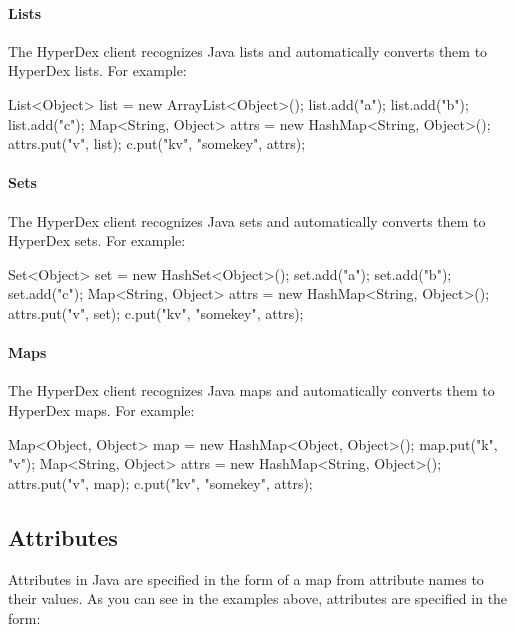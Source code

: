 \paragraph{Lists}

The HyperDex client recognizes Java lists and automatically converts them to
HyperDex lists.  For example:

\begin{javacode}
List<Object> list = new ArrayList<Object>();
list.add("a");
list.add("b");
list.add("c");
Map<String, Object> attrs = new HashMap<String, Object>();
attrs.put("v", list);
c.put("kv", "somekey", attrs);
\end{javacode}

\paragraph{Sets}

The HyperDex client recognizes Java sets and automatically converts them to
HyperDex sets.  For example:

\begin{javacode}
Set<Object> set = new HashSet<Object>();
set.add("a");
set.add("b");
set.add("c");
Map<String, Object> attrs = new HashMap<String, Object>();
attrs.put("v", set);
c.put("kv", "somekey", attrs);
\end{javacode}

\paragraph{Maps}

The HyperDex client recognizes Java maps and automatically converts them to
HyperDex maps.  For example:

\begin{javacode}
Map<Object, Object> map = new HashMap<Object, Object>();
map.put("k", "v");
Map<String, Object> attrs = new HashMap<String, Object>();
attrs.put("v", map);
c.put("kv", "somekey", attrs);
\end{javacode}

\subsection{Attributes}
\label{sec:api:java:attributes}

Attributes in Java are specified in the form of a map from attribute names to
their values.  As you can see in the examples above, attributes are specified in
the form:

